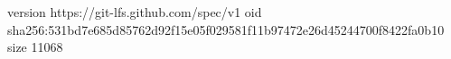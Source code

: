 version https://git-lfs.github.com/spec/v1
oid sha256:531bd7e685d85762d92f15e05f029581f11b97472e26d45244700f8422fa0b10
size 11068
